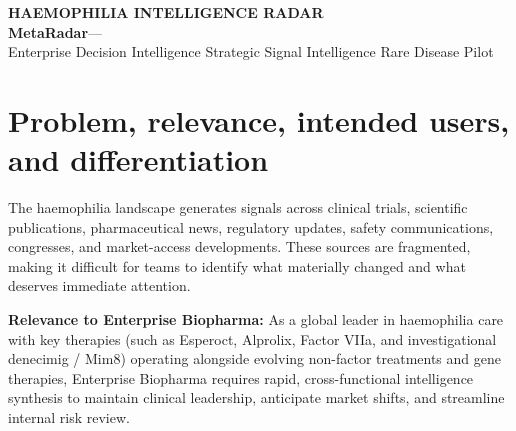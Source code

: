 \documentclass[10pt,a4paper]{article}
\begin{document}
\RaggedRight
\fontsize{7.4pt}{9.0pt}\selectfont

\begin{center}
{\fontsize{16}{17}\selectfont\bfseries\color{Navy}HAEMOPHILIA INTELLIGENCE RADAR}\\[1pt]
{\fontsize{8.5}{9.5}\selectfont\color{Blue}\bfseries MetaRadar}\quad\textcolor{Muted}{---}\\[2.5pt]
{\fontsize{6.8}{7.6}\selectfont Enterprise Decision Intelligence \textbar{} Strategic Signal Intelligence \textbar{} Rare Disease Pilot}
\end{center}
\vspace{-3pt}
\par{}

\section{Problem, relevance, intended users, and differentiation}
The haemophilia landscape generates signals across clinical trials, scientific publications, pharmaceutical news, regulatory updates, safety communications, congresses, and market-access developments. These sources are fragmented, making it difficult for teams to identify what materially changed and what deserves immediate attention.

\textbf{Relevance to Enterprise Biopharma:} As a global leader in haemophilia care with key therapies (such as Esperoct, Alprolix, Factor VIIa, and investigational denecimig / Mim8) operating alongside evolving non-factor treatments and gene therapies, Enterprise Biopharma requires rapid, cross-functional intelligence synthesis to maintain clinical leadership, anticipate market shifts, and streamline internal risk review.
\end{document}
